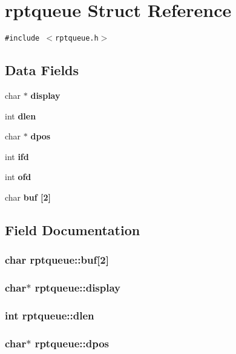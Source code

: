 \section{rptqueue Struct Reference}
\label{structrptqueue}
{\tt \#include $<$rptqueue.h$>$}

\subsection*{Data Fields}
\begin{CompactItemize}
\item 
char $\ast$ \bf{display}
\item 
int \bf{dlen}
\item 
char $\ast$ \bf{dpos}
\item 
int \bf{ifd}
\item 
int \bf{ofd}
\item 
char \bf{buf} [2]
\end{CompactItemize}


\subsection{Field Documentation}
\subsubsection{\setlength{\rightskip}{0pt plus 5cm}char \bf{rptqueue::buf}[2]}\label{structrptqueue_827a36b9a8c8f567773ee3e8352a9b61}


\subsubsection{\setlength{\rightskip}{0pt plus 5cm}char$\ast$ \bf{rptqueue::display}}\label{structrptqueue_a7a32ce1c5884646e21ed00f4f737888}


\subsubsection{\setlength{\rightskip}{0pt plus 5cm}int \bf{rptqueue::dlen}}\label{structrptqueue_5dacfe0bd1b4f05c7ca067069d567994}


\subsubsection{\setlength{\rightskip}{0pt plus 5cm}char$\ast$ \bf{rptqueue::dpos}}\label{structrptqueue_4943f781dac7e53a16167e6878bd6121}



